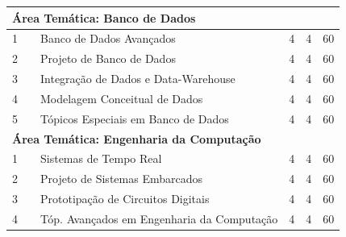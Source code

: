 \documentclass[
	12pt,				%
	openright,			%
  oneside,     %
	a4paper,			%
	english,			%
	french,				%
	spanish,			%
	brazil				%
	]{abntex2}
\begin{document}
\begin{apendicesenv}
\begin{longtable}{r|r|l|r|r|r}
\multicolumn{6}{l}{\textbf{Área Temática: Banco de Dados} } \\ \hline
    1     &       & Banco de Dados Avançados & 4     & 4     & 60 \\ \hline
    2     &       & Projeto de Banco de Dados & 4     & 4     & 60 \\ \hline
    3     &       & Integração de Dados e Data-Warehouse & 4     & 4     & 60 \\ \hline
    4     &       & Modelagem Conceitual de Dados & 4     & 4     & 60 \\ \hline
    5     &       & Tópicos Especiais em Banco de Dados & 4     & 4     & 60 \\ \hline

\multicolumn{6}{l}{\textbf{Área Temática: Engenharia da Computação}}\\ \hline
    1     &       & Sistemas de Tempo Real & 4     & 4     & 60 \\ \hline
    2     &       & Projeto de Sistemas Embarcados & 4     & 4     & 60 \\ \hline
    3     &       & Prototipação de Circuitos Digitais & 4     & 4     & 60 \\ \hline
    4     &       & \small{Tóp. Avançados em Engenharia da Computação} & 4     & 4     & 60 \\ \hline


\end{longtable}
\end{apendicesenv}
\end{document}
